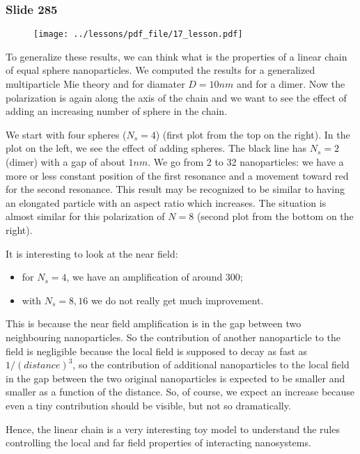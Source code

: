 \documentclass[../main/main.tex]{subfiles}
\begin{document}
\newpage

\subsubsection{Slide 285}

\begin{figure}[h!]
\centering
\texttt{[image: ../lessons/pdf\_file/17\_lesson.pdf]}
\end{figure}

To generalize these results, we can think what is the properties of a linear chain of equal sphere nanoparticles. We computed the results for a generalized multiparticle Mie theory and for diamater $D = 10 nm$ and for a dimer. Now the polarization is again along the axis of the chain and we want to see the effect of adding an increasing number of sphere in the chain.

We start with four spheres ($N_s = 4$) (first plot from the top on the right).
In the plot on the left, we see the effect of adding spheres.
The black line has $N_s = 2$ (dimer) with a gap of about $1 nm$.
We go from 2 to 32 nanoparticles: we have a more or less constant position of the first resonance and a movement toward red for the second resonance. This result may be recognized to be similar to having an elongated particle with an aspect ratio which increases.
The situation is almost similar for this polarization of \( N=8 \) (second plot from the bottom on the right).

It is interesting to look at the near field:
\begin{itemize}
\item  for $N_s = 4$, we have an amplification of around $300$;
\item  with $N_s = 8,16$ we do not really get much improvement.
\end{itemize}
This is because the near field amplification is in the gap between two neighbouring nanoparticles.
So the contribution of another nanoparticle to the field is negligible because the local field is supposed to decay as fast as $1/(distance)^3$, so the contribution of additional nanoparticles to the local field in the gap between the two original nanoparticles is expected to be smaller and smaller as a function of the distance. So, of course, we expect an increase because even a tiny contribution should be visible, but not so dramatically.

Hence, the linear chain is a very interesting toy model to understand the rules controlling the local and far field properties of interacting nanosystems.
\end{document}
